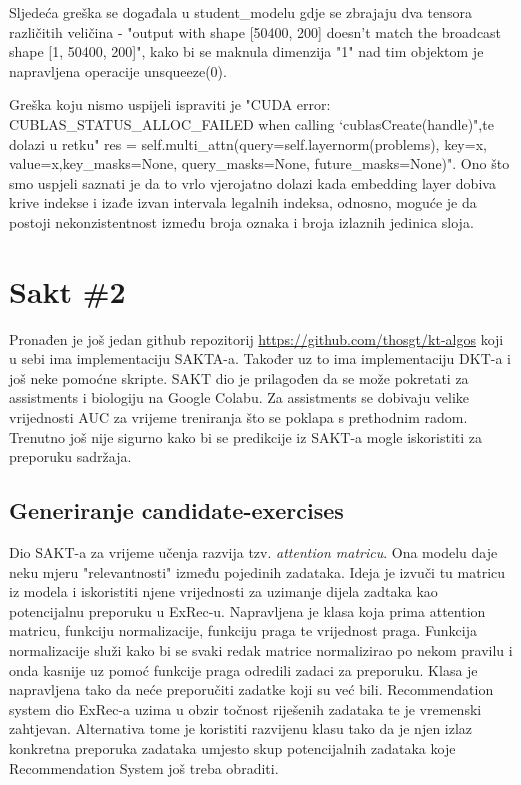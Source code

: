 		Sljedeća greška se događala u student\_modelu gdje se zbrajaju dva tensora različitih veličina - "output with shape [50400, 200] doesn't match the broadcast shape [1, 50400, 200]", kako bi se maknula dimenzija "1" nad tim objektom je napravljena operacije unsqueeze(0).
		
		Greška koju nismo uspijeli ispraviti je "CUDA error: CUBLAS\_STATUS\_ALLOC\_FAILED when calling `cublasCreate(handle)",te dolazi u
		retku" res = self.multi\_attn(query=self.layernorm(problems), key=x, value=x,key\_masks=None, query\_masks=None, future\_masks=None)". Ono što smo uspjeli saznati je da to vrlo vjerojatno dolazi kada embedding layer dobiva krive indekse i izađe izvan intervala legalnih indeksa, odnosno, moguće je da postoji nekonzistentnost između broja oznaka i broja izlaznih jedinica sloja.
		
	\section{Sakt \#2}
		Pronađen je još jedan github repozitorij \url{https://github.com/thosgt/kt-algos} koji u sebi ima implementaciju SAKTA-a. Također uz to ima implementaciju DKT-a i još neke pomoćne skripte. SAKT dio je prilagođen da se može pokretati za assistments i biologiju na Google Colabu. Za assistments se dobivaju velike vrijednosti AUC za vrijeme treniranja što se poklapa s prethodnim radom. Trenutno još nije sigurno kako bi se predikcije iz SAKT-a mogle iskoristiti za preporuku sadržaja.
	
		\subsection{Generiranje candidate-exercises}
		
		Dio SAKT-a za vrijeme učenja razvija tzv. \textit{attention matricu}. Ona modelu daje neku mjeru "relevantnosti" između pojedinih zadataka. Ideja je izvuči tu matricu iz modela i iskoristiti njene vrijednosti za uzimanje dijela zadtaka kao potencijalnu preporuku u ExRec-u. Napravljena je klasa koja prima attention matricu, funkciju normalizacije, funkciju praga te vrijednost praga. Funkcija normalizacije služi kako bi se svaki redak matrice normalizirao po nekom pravilu i onda kasnije uz pomoć funkcije praga odredili zadaci za preporuku. Klasa je napravljena tako da neće preporučiti zadatke koji su već bili. Recommendation system dio ExRec-a uzima u obzir točnost riješenih zadataka te je vremenski zahtjevan. Alternativa tome je koristiti razvijenu klasu tako da je njen izlaz konkretna preporuka zadataka umjesto skup potencijalnih zadataka koje Recommendation System još treba obraditi. 

